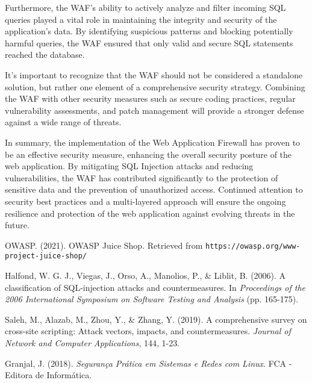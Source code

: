 \documentclass[12pt]{article}
\begin{document}
Furthermore, the WAF's ability to actively analyze and filter incoming SQL queries played a vital role in maintaining the integrity and security of the application's data. By identifying suspicious patterns and blocking potentially harmful queries, the WAF ensured that only valid and secure SQL statements reached the database.

It's important to recognize that the WAF should not be considered a standalone solution, but rather one element of a comprehensive security strategy. Combining the WAF with other security measures such as secure coding practices, regular vulnerability assessments, and patch management will provide a stronger defense against a wide range of threats.

In summary, the implementation of the Web Application Firewall has proven to be an effective security measure, enhancing the overall security posture of the web application. By mitigating SQL Injection attacks and reducing vulnerabilities, the WAF has contributed significantly to the protection of sensitive data and the prevention of unauthorized access. Continued attention to security best practices and a multi-layered approach will ensure the ongoing resilience and protection of the web application against evolving threats in the future.

\begin{thebibliography}{4}

 OWASP. (2021). OWASP Juice Shop. Retrieved from \texttt{https://owasp.org/www-project-juice-shop/}

 Halfond, W. G. J., Viegas, J., Orso, A., Manolios, P., \& Liblit, B. (2006). A classification of SQL-injection attacks and countermeasures. In \textit{Proceedings of the 2006 International Symposium on Software Testing and Analysis} (pp. 165-175).

 Saleh, M., Alazab, M., Zhou, Y., \& Zhang, Y. (2019). A comprehensive survey on cross-site scripting: Attack vectors, impacts, and countermeasures. \textit{Journal of Network and Computer Applications}, 144, 1-23.

 Granjal, J. (2018). \textit{Segurança Prática em Sistemas e Redes com Linux}. FCA - Editora de Informática.


\end{thebibliography}
\end{document}
